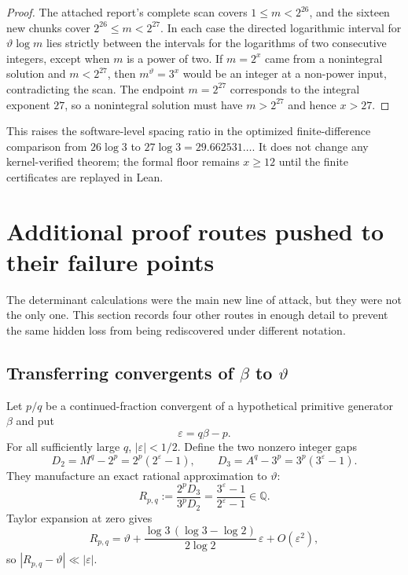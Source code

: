 \documentclass[11pt,oneside]{article}
\theoremstyle{definition}
\theoremstyle{remark}
\newcommand{\Q}{\mathbb Q}
\begin{document}
\begin{proof}
The attached report's complete scan covers $1\le m<2^{26}$, and the sixteen new chunks cover
$2^{26}\le m<2^{27}$.  In each case the directed logarithmic interval for
$\vartheta\log m$ lies strictly between the intervals for the logarithms of two consecutive
integers, except when $m$ is a power of two.  If $m=2^x$ came from a nonintegral solution and
$m<2^{27}$, then $m^\vartheta=3^x$ would be an integer at a non-power input, contradicting the
scan.  The endpoint $m=2^{27}$ corresponds to the integral exponent $27$, so a nonintegral
solution must have $m>2^{27}$ and hence $x>27$.
\end{proof}

This raises the software-level spacing ratio in the optimized finite-difference comparison
from $26\log3$ to $27\log3=29.662531\ldots$.  It does not change any kernel-verified theorem;
the formal floor remains $x\ge12$ until the finite certificates are replayed in Lean.

\section{Additional proof routes pushed to their failure points}
\label{ct:attempts}

The determinant calculations were the main new line of attack, but they were not the only one.
This section records four other routes in enough detail to prevent the same hidden loss from
being rediscovered under different notation.

\subsection{Transferring convergents of \texorpdfstring{$\beta$}{beta} to
\texorpdfstring{$\vartheta$}{theta}}
\label{subsec:transfer}

Let $p/q$ be a continued-fraction convergent of a hypothetical primitive generator $\beta$ and
put
\[
 \varepsilon=q\beta-p.
\]
For all sufficiently large $q$, $|\varepsilon|<1/2$.  Define the two nonzero integer gaps
\begin{equation}\label{eq:D2D3}
 D_2=M^q-2^p=2^p(2^\varepsilon-1),
 \qquad
 D_3=A^q-3^p=3^p(3^\varepsilon-1).
\end{equation}
They manufacture an exact rational approximation to $\vartheta$:
\begin{equation}\label{eq:theta-transfer}
 R_{p,q}:=
 \frac{2^pD_3}{3^pD_2}
 =\frac{3^\varepsilon-1}{2^\varepsilon-1}
 \in\Q.
\end{equation}
Taylor expansion at zero gives
\begin{equation}\label{eq:theta-transfer-error}
 R_{p,q}=\vartheta+
 \frac{\log3\,(\log3-\log2)}{2\log2}\,\varepsilon
 +O(\varepsilon^2),
\end{equation}
so $|R_{p,q}-\vartheta|\ll|\varepsilon|$.
\end{document}

